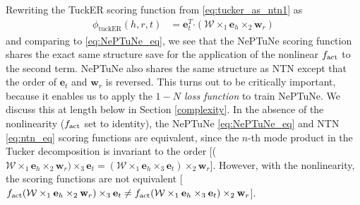 \documentclass[11pt]{article}
\newcommand{\bigcdot}{\boldsymbol{\cdot}}
\begin{document}
Rewriting the TuckER scoring function from \eqref{eq:tucker_as_ntn1} as
\begin{align}
    \phi_{\text{tuckER}}(h, r, t) 
&= \mathbf{e}_t^T \bigcdot (\mathrm{\mathcal{W}} \times_1 \mathbf{e}_h \times_2 \mathbf{w}_r) \label{eq:tucker_as_neptune}
\end{align}
and comparing to \eqref{eq:NePTuNe_eq}, we see that the NePTuNe scoring function shares the exact same structure save for the application of the nonlinear $f_{\rm act}$ to the second term.
NePTuNe also shares the same structure as NTN except that the order of $\mathbf{e}_t$ and $\mathbf{w}_r$ is reversed.
This turns out to be critically important, because it enables us to apply the {\em $1-N$ loss function} to train NePTuNe.
We discuss this at length below in Section \ref{complexity}. 
In the absence of the nonlinearity ($f_{\rm act}$ set to identity), the NePTuNe \eqref{eq:NePTuNe_eq} and NTN \eqref{eq:ntn_eq} scoring functions are equivalent, since the $n$-th mode product in the Tucker decomposition is invariant to the order [($\mathrm{\mathcal{W}} \times_1 \mathbf{e}_h \times_2 \mathbf{w}_r) \times_3 \mathbf{e}_t = (\mathrm{\mathcal{W}} \times_1 \mathbf{e}_h \times_3 \mathbf{e}_t) \times_2 \mathbf{w}_r$]. 
However, with the nonlinearity, the scoring functions are not equivalent [$f_{\rm act}(\mathrm{\mathcal{W}} \times_1 \mathbf{e}_h \times_2 \mathbf{w}_r) \times_3 \mathbf{e}_t \neq f_{\rm act}(\mathrm{\mathcal{W}} \times_1 \mathbf{e}_h \times_3 \mathbf{e}_t) \times_2 \mathbf{w}_r$].
\end{document}
